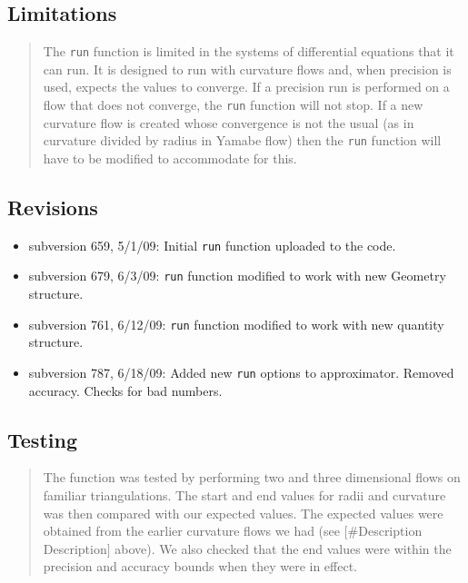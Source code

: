 \documentclass[10pt]{article}%
\begin{document}
\subsection*{Limitations}

\begin{quotation} The \texttt{run} function is limited in the systems of differential equations that it can run. It is designed to run with curvature flows and, when precision is used, expects the values to converge. If a precision run is performed on a flow that does not converge, the \texttt{run} function will not stop. If a new curvature flow is created whose convergence is not the usual (as in curvature divided by radius in Yamabe flow) then the \texttt{run} function will have to be modified to accommodate for this.\end{quotation}

\subsection*{Revisions}

\begin{itemize}\item  subversion 659, 5/1/09: Initial \texttt{run} function uploaded to the code.
\item  subversion 679, 6/3/09: \texttt{run} function modified to work with new Geometry structure.
\item  subversion 761, 6/12/09: \texttt{run} function modified to work with new quantity structure.
\item  subversion 787, 6/18/09: Added new \texttt{run} options to approximator. Removed accuracy. Checks for bad numbers.
\end{itemize}

\subsection*{Testing}

\begin{quotation} The function was tested by performing two and three dimensional flows on familiar triangulations. The start and end values for radii and curvature was then compared with our expected values. The expected values were obtained from the earlier curvature flows we had (see \mbox{$[$}\#Description Description\mbox{$]$} above). We also checked that the end values were within the precision and accuracy bounds when they were in effect. \end{quotation}
\end{document}
